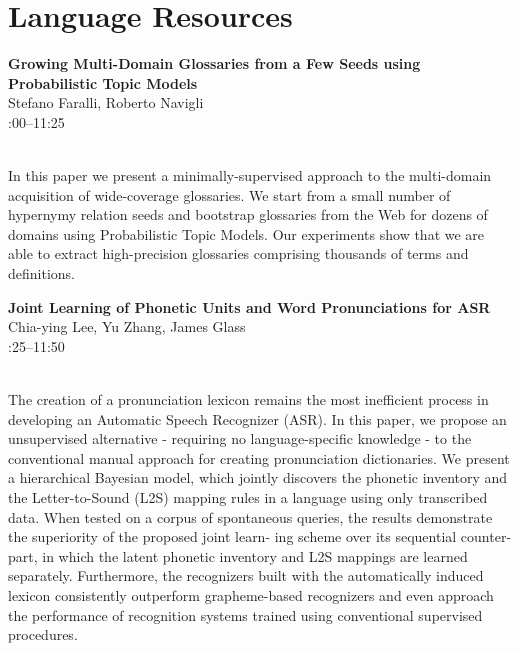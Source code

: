 \documentclass[twoside,makeidx]{book}
\renewcommand{\normalsize}{\fontsize{8}{9}\selectfont}
\renewcommand{\small}{\fontsize{7}{8}\selectfont}
\begin{document}
\section{Language Resources}
\vspace{-1em}
\par\vspace{2em}\noindent%
\begin{minipage}{\linewidth}%
\begin{center}
\textbf{\normalsize Growing Multi-Domain Glossaries from a Few Seeds using Probabilistic Topic Models}\\
\normalsize  Stefano Faralli,  Roberto Navigli\\
{\small 11:00--11:25}\\
\end{center}
\end{minipage}\\[0.5em]
\nopagebreak%
\noindent%
{\small In this paper we present a minimally-supervised approach to the multi-domain acquisition of wide-coverage glossaries. We start from a small number of hypernymy relation seeds and bootstrap glossaries from the Web for dozens of domains using Probabilistic Topic Models. Our experiments show that we are able to extract high-precision glossaries comprising thousands of terms and definitions.}
\par\vspace{2em}\noindent%
\begin{minipage}{\linewidth}%
\begin{center}
\textbf{\normalsize Joint Learning of Phonetic Units and Word Pronunciations for ASR}\\
\normalsize  Chia-ying Lee,  Yu Zhang,  James Glass\\
{\small 11:25--11:50}\\
\end{center}
\end{minipage}\\[0.5em]
\nopagebreak%
\noindent%
{\small The creation of a pronunciation lexicon remains the most inefficient process in developing an Automatic Speech Recognizer (ASR). In this paper, we propose an unsupervised alternative - requiring no language-specific knowledge - to the conventional manual approach for creating pronunciation dictionaries. We present a hierarchical Bayesian model, which jointly discovers the phonetic inventory and the Letter-to-Sound (L2S) mapping rules in a language using only transcribed data. When tested on a corpus of spontaneous queries, the results demonstrate the superiority of the proposed joint learn- ing scheme over its sequential counter- part, in which the latent phonetic inventory and L2S mappings are learned separately. Furthermore, the recognizers built with the automatically induced lexicon consistently outperform grapheme-based recognizers and even approach the performance of recognition systems trained using conventional supervised procedures.}
\end{document}
